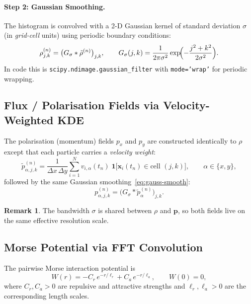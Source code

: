 \documentclass[11pt, letterpaper]{article}
\theoremstyle{definition}
\newtheorem{remark}{Remark}[section]
\newcommand{\vp}{\mathbf{p}}
\newcommand{\vx}{\mathbf{x}}
\begin{document}
\paragraph{Step 2: Gaussian Smoothing.}
The histogram is convolved with a 2-D Gaussian kernel of standard
deviation $\sigma$ (in \emph{grid-cell} units) using periodic
boundary conditions:
\begin{equation}
\label{eq:gauss-smooth}
  \rho_{j,k}^{(n)}
  = \bigl(G_{\sigma} * \tilde{\rho}^{(n)}\bigr)_{j,k},
  \qquad
  G_{\sigma}(j,k)
  = \frac{1}{2\pi\sigma^{2}}
    \exp\!\Bigl(-\frac{j^{2}+k^{2}}{2\sigma^{2}}\Bigr).
\end{equation}
In code this is \texttt{scipy.ndimage.gaussian\_filter} with
\texttt{mode='wrap'} for periodic wrapping.

\subsection{Flux / Polarisation Fields via Velocity-Weighted KDE}
\label{sec:kde-flux}

The polarisation (momentum) fields $p_x$ and $p_y$ are constructed
identically to $\rho$ except that each particle carries a
\emph{velocity weight}:
\begin{equation}
\label{eq:flux-kde}
  \tilde{p}_{\alpha,j,k}^{(n)}
  = \frac{1}{\Delta x \, \Delta y}
    \sum_{i=1}^{N}
    v_{i,\alpha}(t_n)\;\mathbf{1}\!\bigl[
      \vx_i(t_n) \in \text{cell } (j,k)
    \bigr],
  \qquad \alpha \in \{x, y\},
\end{equation}
followed by the same Gaussian smoothing~\eqref{eq:gauss-smooth}:
\begin{equation}
  p_{\alpha,j,k}^{(n)}
  = \bigl(G_{\sigma} * \tilde{p}_{\alpha}^{(n)}\bigr)_{j,k}.
\end{equation}

\begin{remark}
The bandwidth $\sigma$ is shared between $\rho$ and $\vp$, so both
fields live on the same effective resolution scale.
\end{remark}

\subsection{Morse Potential via FFT Convolution}
\label{sec:morse}

The pairwise Morse interaction potential is
\begin{equation}
\label{eq:morse-kernel}
  W(r) = -C_r \, e^{-r/\ell_r} + C_a \, e^{-r/\ell_a},
  \qquad W(0) = 0,
\end{equation}
where $C_r, C_a > 0$ are repulsive and attractive strengths and
$\ell_r, \ell_a > 0$ are the corresponding length scales.
\end{document}
